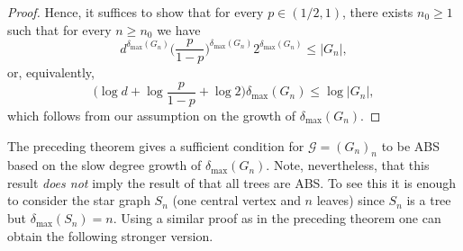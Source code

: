 \documentclass[a4paper,onecolumn,accepted=2024-12-14]{quantumarticle}
\theoremstyle{plain}
\newcommand{\cG}{{\mathcal G}}         %
\begin{document}
\begin{proof}
Hence, it suffices to show that  for every $p\in (1/2,1)$, there exists $n_0\geq 1$ such that for every $n\geq n_0$ we have
\begin{equation}
d^{\delta_\mathrm{max}(G_n)}\Big(\frac{p}{1-p}\Big)^{\delta_\mathrm{max}(G_n)}2^{\delta_\mathrm{max}(G_n)}\leq |G_n|,
\end{equation}
or, equivalently,
\begin{equation}
\Big(\log d+ \log \frac{p}{1-p}+\log 2\Big)
  \delta_\mathrm{max}(G_n)\leq \log |G_n|,
\end{equation}
which follows from our assumption on the growth of $\delta_\mathrm{max}(G_n)$.
\end{proof}


The preceding theorem gives a sufficient condition for $\cG=(G_n)_n$ to be ABS based on the slow degree
growth of $\delta_{\mathrm{max}}(G_n)$. Note, nevertheless, that this result \textit{does not} imply the result of \cite{ASGME} that all trees
are ABS. To see this it is enough to consider the star graph $S_n$ (one
central vertex and $n$ leaves) since $S_n$ is a tree but $\delta_{\mathrm{max}}(S_n)=n$.
Using a similar proof as in the preceding theorem one can obtain the following
stronger version.
\end{document}
